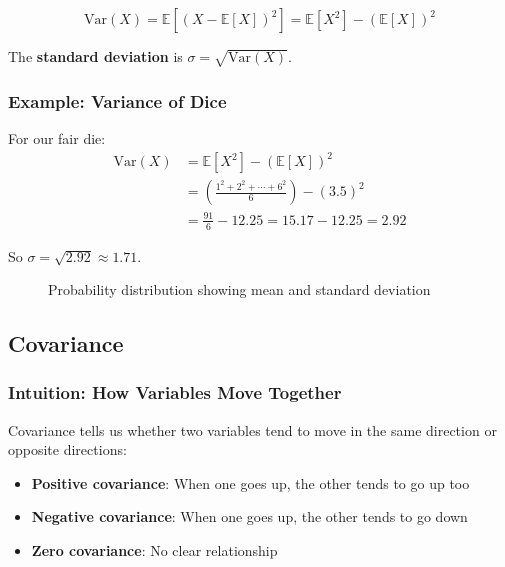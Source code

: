 \begin{equation}
\text{Var}(X) = \mathbb{E}[(X - \mathbb{E}[X])^2] = \mathbb{E}[X^2] - (\mathbb{E}[X])^2
\end{equation}

The \textbf{standard deviation} is $\sigma = \sqrt{\text{Var}(X)}$.

\subsubsection{Example: Variance of Dice}

For our fair die:
\begin{align}
\text{Var}(X) &= \mathbb{E}[X^2] - (\mathbb{E}[X])^2 \\
&= \left(\frac{1^2 + 2^2 + \cdots + 6^2}{6}\right) - (3.5)^2 \\
&= \frac{91}{6} - 12.25 = 15.17 - 12.25 = 2.92
\end{align}

So $\sigma = \sqrt{2.92} \approx 1.71$.

\begin{figure}[h]
\centering
{}
\caption{Probability distribution showing mean and standard deviation}
\label{fig:dice-variance}
\end{figure}

\subsection{Covariance}

\subsubsection{Intuition: How Variables Move Together}

Covariance tells us whether two variables tend to move in the same direction or opposite directions:
\begin{itemize}
    \item \textbf{Positive covariance}: When one goes up, the other tends to go up too
    \item \textbf{Negative covariance}: When one goes up, the other tends to go down
    \item \textbf{Zero covariance}: No clear relationship
\end{itemize}

